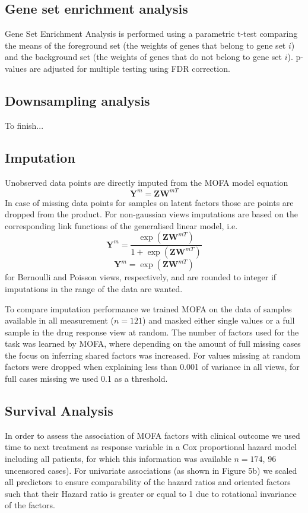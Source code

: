 \documentclass[10pt, a4paper,openany]{report}
\begin{document}
\subsection{Gene set enrichment analysis}
Gene Set Enrichment Analysis is performed using a parametric t-test comparing the means of the foreground set (the weights of genes that belong to gene set $i$) and the background set (the weights of genes that do not belong to gene set $i$). p-values are adjusted for multiple testing using FDR correction.

\subsection{Downsampling analysis}
To finish...

\subsection{Imputation}
Unobserved data points are directly imputed from the MOFA model equation
\[
\mathbf{Y}^m = \mathbf{Z}\mathbf{W}^{mT}
\]
In case of missing data points for samples on latent factors those are points are dropped from the product.
For non-gaussian views imputations are based on the corresponding link functions of the generalised linear model, i.e.  
\[
\mathbf{Y}^m = \frac{\exp(\mathbf{Z}\mathbf{W}^{mT})}{1+\exp(\mathbf{Z}\mathbf{W}^{mT})}
\]
\[
\mathbf{Y}^m = \exp(\mathbf{Z}\mathbf{W}^{mT})
\]
for Bernoulli and Poisson views, respectively, and are rounded to integer if imputations in the range of the data are wanted.

To compare imputation performance we trained MOFA on the data of samples available in all measurement ($n=121$) and masked either single values or a full sample in the drug response view at random. The number of factors used for the task was learned by MOFA, where depending on the amount of full missing cases the focus on inferring shared factors was increased. For values missing at random factors were dropped when explaining less than 0.001 of variance in all views, for full cases missing we used 0.1 as a threshold.

\subsection{Survival Analysis}
In order to assess the association of MOFA factors with clinical outcome we used time to next treatment as response variable in a Cox proportional hazard model including all patients, for which this information was available $n=174$, 96 uncensored cases). For univariate associations (as shown in Figure 5b) we scaled all predictors to ensure comparability of the hazard ratios and oriented factors such that their Hazard ratio is greater or equal to 1 due to rotational invariance of the factors. 
\end{document}

